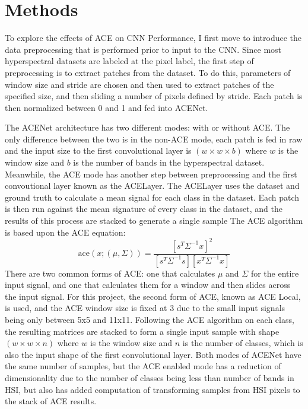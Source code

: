 \documentclass[12pt]{article}
\begin{document}
%
\section{Methods}\label{sec:methods}
To explore the effects of ACE on CNN Performance, I first move to introduce the data preprocessing that is performed prior to input to the CNN.
%
Since most hyperspectral datasets are labeled at the pixel label, the first step of preprocessing is to extract patches from the dataset.
%
To do this, parameters of window size and stride are chosen and then used to extract patches of the specified size, and then sliding a number of pixels defined by stride.
%
Each patch is then normalized between 0 and 1 and fed into ACENet.

The ACENet architecture has two different modes: with or without ACE.
%
The only difference between the two is in the non-ACE mode, each patch is fed in raw and the input size to the first convolutional layer is $(w \times w \times b)$ where $w$ is the window size and $b$ is the number of bands in the hyperspectral dataset.
%
Meanwhile, the ACE mode has another step between preprocessing and the first convoutional layer known as the ACELayer.
%
The ACELayer uses the dataset and ground truth to calculate a mean signal for each class in the dataset.
%
Each patch is then run against the mean signature of every class in the dataset, and the results of this process are stacked to generate a single sample
%
The ACE algorithm is based upon the ACE equation:
$$
\text{ace}(x;(\mu,\Sigma)) = \frac{ \left[s^T \Sigma^{-1} x\right]^2 }{\left[s^T \Sigma^{-1} s\right] \left[x^T \Sigma^{-1} x\right]}
$$
%
There are two common forms of ACE: one that calculates $\mu$ and $\Sigma$ for the entire input signal, and one that calculates them for a window and then slides across the input signal.
%
For this project, the second form of ACE, known as ACE Local, is used, and the ACE window size is fixed at 3 due to the small input signals being only between 5x5 and 11x11.
%
Following the ACE algorithm on each class, the resulting matrices are stacked to form a single input sample with shape $(w \times w \times n)$ where $w$ is the window size and $n$ is the number of classes, which is also the input shape of the first convolutional layer.
%
Both modes of ACENet have the same number of samples, but the ACE enabled mode has a reduction of dimensionality due to the number of classes being less than number of bands in HSI, but also has added computation of transforming samples from HSI pixels to the stack of ACE results.
\end{document}
